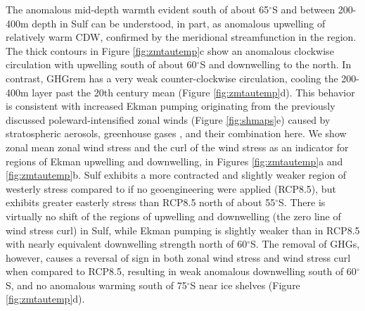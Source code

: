 \documentclass[grl]{AGUTeX}  %
\begin{document}
\begin{article}
The anomalous mid-depth warmth evident south of about 65$^\circ$S and between 200-400m depth in Sulf can be understood, in part, as anomalous upwelling of relatively warm CDW, confirmed by the meridional streamfunction in the region. The thick contours in Figure \ref{fig:zmtautemp}c show an anomalous clockwise circulation with upwelling south of about 60$^\circ$S and downwelling to the north. In contrast, GHGrem has a very weak counter-clockwise circulation, cooling the 200-400m layer past the 20th century mean (Figure \ref{fig:zmtautemp}d). This behavior is consistent with increased Ekman pumping originating from the previously discussed poleward-intensified zonal winds (Figure \ref{fig:shmaps}e) caused by stratospheric aerosols, greenhouse gases \citep{fyfe07}, and their combination here. We show zonal mean zonal wind stress and the curl of the wind stress as an indicator for regions of Ekman upwelling and downwelling, in Figures \ref{fig:zmtautemp}a and \ref{fig:zmtautemp}b. Sulf exhibits a more contracted and slightly weaker region of westerly stress compared to if no geoengineering were applied (RCP8.5), but exhibits greater easterly stress than RCP8.5 north of about 55$^\circ$S. There is virtually no shift of the regions of upwelling and downwelling (the zero line of wind stress curl) in Sulf, while Ekman pumping is slightly weaker than in RCP8.5 with nearly equivalent downwelling strength north of 60$^\circ$S. The removal of GHGs, however, causes a reversal of sign in both zonal wind stress and wind stress curl when compared to RCP8.5, resulting in weak anomalous downwelling south of 60$^\circ$S, and no anomalous warming south of 75$^\circ$S near ice shelves (Figure \ref{fig:zmtautemp}d). %


\end{article}
\end{document}
